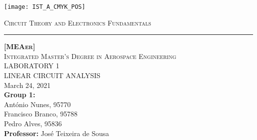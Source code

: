 \thispagestyle {empty}

\begin{titlepage}

\texttt{[image: IST\_A\_CMYK\_POS]} \\[1cm]

\centering

\textsc{\large{Circuit Theory and Electronics Fundamentals}} \\[0.25cm]
\hrule
\vspace{1.75cm}

\textsc{\textbf {[MEAer]}} \\[0.5cm]
\textsc{Integrated Master's Degree in Aerospace Engineering} \\[3.25cm]
\MakeUppercase{\Huge Laboratory 1} \\[0.75cm]
\MakeUppercase{\huge Linear Circuit Analysis} \\[3.5cm]
March 24, 2021 \\[2.5cm]
\textbf{Group 1:} \\[0.5cm]
António Nunes, 95770 \\
Francisco Branco, 95788 \\
Pedro Alves, 95836 \\[2cm]
\textbf{Professor:} José Teixeira de Sousa 
\end{titlepage}
